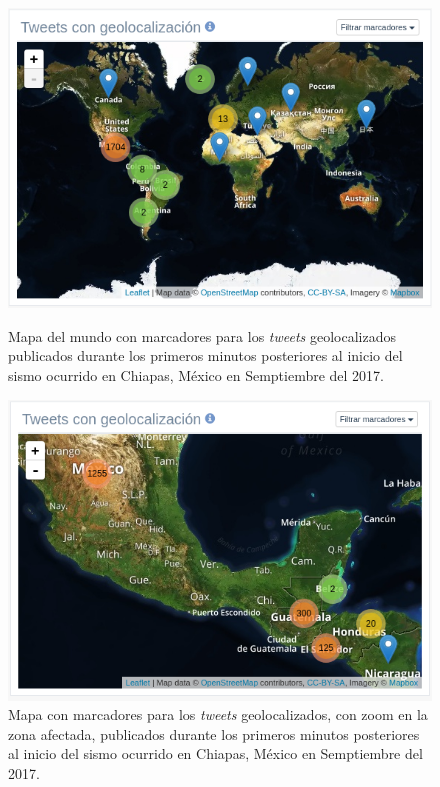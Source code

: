		\begin{figure}[!h]
 \includegraphics[width=\textwidth]{imagenes/img-worldmap-mexico.png}
	  \caption{Mapa del mundo con marcadores para los \textit{tweets} geolocalizados publicados durante los primeros minutos posteriores al inicio del sismo ocurrido en Chiapas, México en Semptiembre del 2017.}
		\label{fig:worldmap-mexico}
\endminipage\hfill
{}
 \includegraphics[trim={0 0 0 0}, clip, width=\textwidth]{imagenes/img-worldmap-zoom-mexico.png}
	  \caption{Mapa con marcadores para los \textit{tweets} geolocalizados, con zoom en la zona afectada,  publicados durante los primeros minutos posteriores al inicio del sismo ocurrido en Chiapas, México en Semptiembre del 2017.}
		\label{fig:worldmap-zoom-mexico}
\endminipage\hfill
\end{figure}
	

